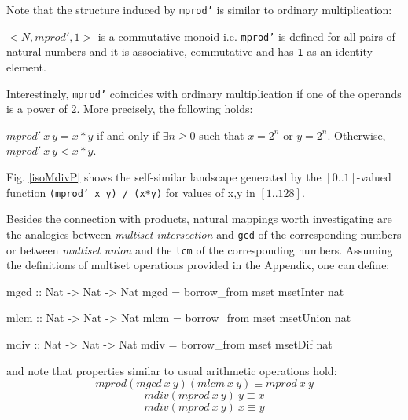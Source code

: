 \documentclass[]{INCLUDES/llncs}
\begin{document}
Note that the structure induced by {\tt mprod'} is similar to ordinary
multiplication:
\begin{prop}
$<N,mprod',1>$ is a commutative monoid i.e. {\tt mprod'} is defined for all pairs of
natural numbers and it is associative, commutative
and has {\tt 1} as an identity element.
\end{prop}
Interestingly, {\tt mprod'} coincides with ordinary multiplication if one of the
operands is a power of 2. More precisely, the following holds:
\begin{prop}
$mprod'~x~y = x * y$ if and only if 
$\exists n \geq 0$ such that $x=2^n$ or $y=2^n$.
Otherwise, $mprod'~x~y <  x * y$.
\end{prop}
Fig. \ref{isoMdivP} shows the self-similar landscape
generated by the $[0..1]$-valued function {\tt (mprod' x y) / (x*y)}
for values of x,y in $[1..128]$.

Besides the connection with products, natural mappings worth investigating are
the analogies between {\em multiset intersection} and {\tt gcd} of the
corresponding numbers or between {\em multiset
union} and the {\tt lcm} of the corresponding numbers. Assuming the
definitions of multiset operations provided in the Appendix, one can define:

\begin{code}
mgcd :: Nat -> Nat -> Nat
mgcd = borrow_from mset msetInter nat

mlcm :: Nat -> Nat -> Nat
mlcm = borrow_from mset msetUnion nat

mdiv :: Nat -> Nat -> Nat
mdiv = borrow_from mset msetDif nat
\end{code}
and note that properties similar to usual arithmetic operations hold:
\begin{equation}
mprod (mgcd~x~y) (mlcm~x~y)  \equiv mprod~x~y
\end{equation}
\begin{equation}
mdiv (mprod~x~y)~y \equiv x
\end{equation}
\begin{equation}
mdiv (mprod~x~y)~x \equiv y
\end{equation}
\end{document}
